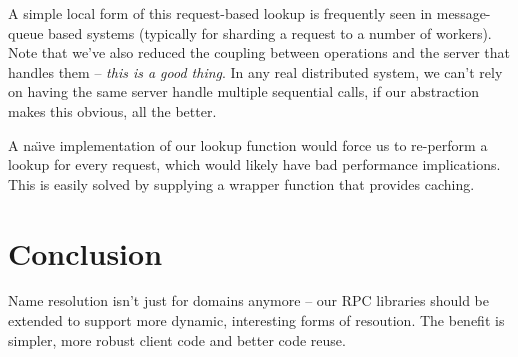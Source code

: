 \documentclass[psfig,10pt]{article}
\begin{document}
A simple local form of this request-based lookup is frequently seen in
message-queue based systems (typically for sharding a request to a number of
workers).  Note that we've also reduced the coupling between operations and the
server that handles them -- \emph{this is a good thing}.  In any real
distributed system, we can't rely on having the same server handle multiple
sequential calls, if our abstraction makes this obvious, all the better.

A na\"{\i}ve implementation of our lookup function would force us to re-perform
a lookup for every request, which would likely have bad performance
implications.  This is easily solved by supplying a wrapper function that
provides caching.

\section{Conclusion}
Name resolution isn't just for domains anymore -- our RPC libraries should be
extended to support more dynamic, interesting forms of resoution.  The benefit
is simpler, more robust client code and better code reuse.



\end{document}
